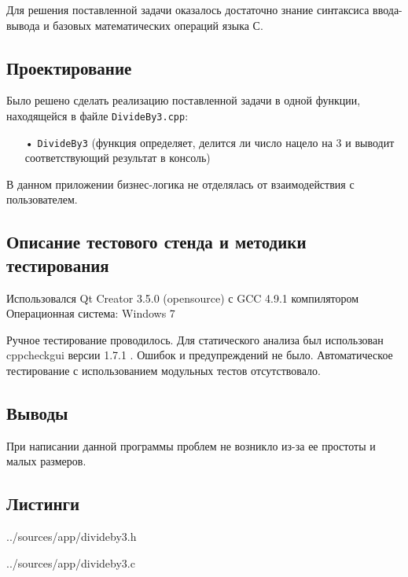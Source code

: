 \documentclass[12pt,a4paper]{report}
\begin{document}
Для решения поставленной задачи оказалось достаточно знание синтаксиса ввода-вывода и базовых математических операций языка С.

\subsection{Проектирование}

Было решено сделать реализацию поставленной задачи в одной функции, находящейся в файле  \verb-DivideBy3.cpp-:
\begin{enumerate}
\item[•]  \verb-DivideBy3- (функция определяет, делится ли число нацело на 3 и выводит соответствующий результат в консоль)
\end{enumerate}

В данном приложении бизнес-логика не отделялась от взаимодействия с пользователем.

\subsection{Описание тестового стенда и методики тестирования}

Использовался Qt Creator 3.5.0 (opensource) с GCC 4.9.1 компилятором
Операционная система: Windows 7


Ручное тестирование проводилось.
Для статического анализа был использован cppcheckgui версии 1.7.1 . Ошибок и предупреждений не было.
Автоматическое тестирование с использованием модульных тестов отсутствовало.


\subsection{Выводы}

При написании данной программы проблем не возникло из-за ее простоты и малых размеров.

\subsection{Листинги}

{../sources/app/divideby3.h}

{../sources/app/divideby3.c}
\end{document}
